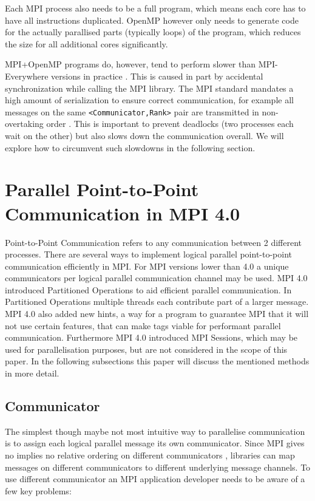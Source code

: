 \documentclass[sigconf]{acmart}
\begin{document}
Each MPI process also needs to be a full program, which means each core has to have all instructions duplicated.
OpenMP however only needs to generate code for the actually parallised parts (typically loops) of the program, which reduces the size for all additional cores significantly.

MPI+OpenMP programs do, however, tend to perform slower than MPI-Everywhere versions in practice \cite{zambreLessonsLearned2022}.
This is caused in part by accidental synchronization while calling the MPI library.
The MPI standard mandates a high amount of serialization to ensure correct communication, for example all messages on the same \verb|<Communicator,Rank>| pair are transmitted in non-overtaking order \cite{mpi40}.
This is important to prevent deadlocks (two processes each wait on the other) but also slows down the communication overall.
We will explore how to circumvent such slowdowns in the following section.


\section{Parallel Point-to-Point Communication in MPI 4.0}

Point-to-Point Communication refers to any communication between 2 different processes.
There are several ways to implement logical parallel point-to-point communication efficiently in MPI.
For MPI versions lower than 4.0 a unique communicators per logical parallel communication channel may be used.
MPI 4.0 introduced Partitioned Operations to aid efficient parallel communication.
In Partitioned Operations multiple threads each contribute part of a larger message.
MPI 4.0 also added new hints, a way for a program to guarantee MPI that it will not use certain features, that can make tags viable for performant parallel communication.
Furthermore MPI 4.0 introduced MPI Sessions, which may be used for parallelisation purposes, but are not considered in the scope of this paper.
In the following subsections this paper will discuss the mentioned methods in more detail.

\subsection{Communicator}

The simplest though maybe not most intuitive way to parallelise communication is to assign each logical parallel message its own communicator.
Since MPI gives no implies no relative ordering on different communicators \cite{zambreLessonsLearned2022}, libraries can map messages on different communicators to different underlying message channels.
To use different communicator an MPI application developer needs to be aware of a few key problems:
\end{document}
